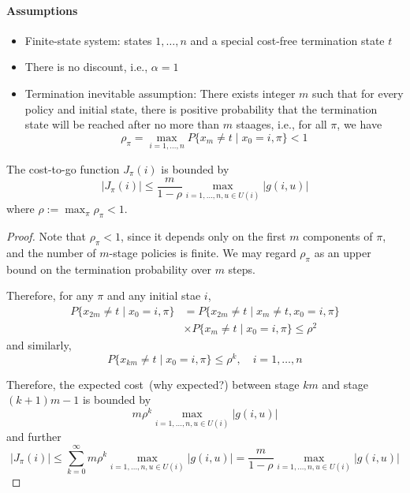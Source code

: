 \paragraph{Assumptions}
\begin{itemize}
\item
Finite-state system: states $1,\dots,n$ and a special cost-free termination state $t$
\item
There is no discount, i.e., $\alpha=1$
\item
Termination inevitable assumption:
There exists integer $m$ such that for every policy and initial state, there is positive probability that the termination state will be reached after no more than $m$ staages, i.e., for all $\pi$, we have
\[
\rho_{\pi} = \max_{i=1,\dots,n}P\{x_m\ne t\mid x_0=i,\pi\}<1
\]
\end{itemize}
\begin{lemma}
The cost-to-go function $J_{\pi}(i)$ is bounded by
\[
|J_{\pi}(i)|\le\frac{m}{1-\rho}\max_{i=1,\dots,n,u\in U(i)}|g(i,u)|
\]
where $\rho:=\max_{\pi}\rho_{\pi}<1$.
\end{lemma}
\begin{proof}
Note that $\rho_{\pi}<1$, since it depends only on the first $m$ components of $\pi$, and the number of $m$-stage policies is finite.
We may regard $\rho_{\pi}$ as an upper bound on the termination probability over $m$ steps.

Therefore, for any $\pi$ and any initial stae $i$,
\begin{align*}
P\{x_{2m}\ne t\mid x_0=i,\pi\}&=P\{x_{2m}\ne t\mid x_m\ne t,x_0=i,\pi\}\\
&\times P\{x_m\ne t\mid x_0=i,\pi\}\le\rho^2
\end{align*}
and similarly,
\[
P\{x_{km}\ne t\mid x_0=i,\pi\}\le \rho^k,\quad i=1,\dots,n
\]

Therefore, the expected cost~(why expected?) between stage $km$ and stage $(k+1)m-1$ is bounded by
\[
m\rho^k\max_{i=1,\dots,n,u\in U(i)}|g(i,u)|
\]
and further 
\[
|J_\pi(i)|\le \sum_{k=0}^\infty m\rho^k\max_{i=1,\dots,n,u\in U(i)}|g(i,u)| = \frac{m}{1-\rho}\max_{i=1,\dots,n,u\in U(i)}|g(i,u)|
\]


\end{proof}


